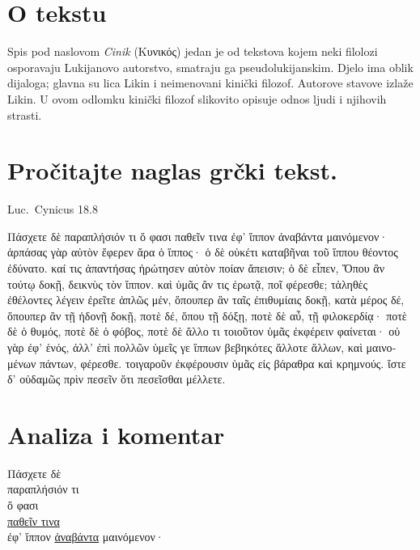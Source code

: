 
\section*{O tekstu}

Spis pod naslovom \textit{Cinik} (Κυνικός) jedan je od tekstova kojem neki filolozi osporavaju Lukijanovo autorstvo, smatraju ga pseudolukijanskim. Djelo ima oblik dijaloga; glavna su lica Likin i neimenovani kinički filozof. Autorove stavove izlaže Likin. U ovom odlomku kinički filozof slikovito opisuje odnos ljudi i njihovih strasti.


\section*{Pročitajte naglas grčki tekst.}
Luc.\ Cynicus 18.8


\medskip

{\large
\begin{greek}
\noindent Πάσχετε δὲ παραπλήσιόν τι ὅ φασι παθεῖν τινα ἐφ' ἵππον ἀναβάντα μαινόμενον· ἁρπάσας γὰρ αὐτὸν ἔφερεν ἄρα ὁ ἵππος· ὁ δὲ οὐκέτι καταβῆναι τοῦ ἵππου θέοντος ἐδύνατο. καί τις ἀπαντήσας ἠρώτησεν αὐτὸν ποίαν ἄπεισιν; ὁ δὲ εἶπεν, Ὅπου ἂν τούτῳ δοκῇ, δεικνὺς τὸν ἵππον. καὶ ὑμᾶς ἄν τις ἐρωτᾷ, ποῖ φέρεσθε; τἀληθὲς ἐθέλοντες λέγειν ἐρεῖτε ἁπλῶς μέν, ὅπουπερ ἂν ταῖς ἐπιθυμίαις δοκῇ, κατὰ μέρος δέ, ὅπουπερ ἂν τῇ ἡδονῇ δοκῇ, ποτὲ δέ, ὅπου τῇ δόξῃ, ποτὲ δὲ αὖ, τῇ φιλοκερδίᾳ· ποτὲ δὲ ὁ θυμός, ποτὲ δὲ ὁ φόβος, ποτὲ δὲ ἄλλο τι τοιοῦτον ὑμᾶς ἐκφέρειν φαίνεται· οὐ γὰρ  ἐφ' ἑνός, ἀλλ' ἐπὶ πολλῶν ὑμεῖς γε ἵππων βεβηκότες ἄλλοτε ἄλλων, καὶ μαινομένων πάντων, φέρεσθε. τοιγαροῦν ἐκφέρουσιν ὑμᾶς εἰς βάραθρα καὶ κρημνούς. ἴστε δ' οὐδαμῶς πρὶν πεσεῖν ὅτι πεσεῖσθαι μέλλετε.

\end{greek}

}

\section*{Analiza i komentar}



{\large
\begin{greek}
\noindent Πάσχετε δὲ \\
\tabto{2em} παραπλήσιόν τι \\
\tabto{4em} ὅ φασι \\
\tabto{6em} \underline{παθεῖν τινα} \\
\tabto{8em} ἐφ' ἵππον \underline{ἀναβάντα} μαινόμενον·\\

\end{greek}
}

